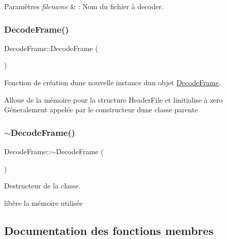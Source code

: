 \begin{DoxyParams}{Paramètres}
{\em filename} & \+: Nom du fichier à decoder. \\
\hline
\end{DoxyParams}
\mbox{\label{class_decode_frame_ae6ae88ee29bcaff936e7c7b2380f96b4}} 
\subsubsection{\texorpdfstring{Decode\+Frame()}{DecodeFrame()}\hspace{0.1cm}{\footnotesize\ttfamily [2/2]}}
{\footnotesize\ttfamily Decode\+Frame\+::\+Decode\+Frame (\begin{DoxyParamCaption}{ }\end{DoxyParamCaption})}



Fonction de création d\textquotesingle{}une nouvelle instance d\textquotesingle{}un objet \hyperlink{class_decode_frame}{Decode\+Frame}. 

Alloue de la mémoire pour la structure Header\+File et l\textquotesingle{}initialise à zero ~\newline
 Géneralement appelée par le constructeur d\textquotesingle{}une classe parente \mbox{\label{class_decode_frame_a150abde40a177b9b585c75d562516f2a}} 
\subsubsection{\texorpdfstring{$\sim$\+Decode\+Frame()}{~DecodeFrame()}}
{\footnotesize\ttfamily Decode\+Frame\+::$\sim$\+Decode\+Frame (\begin{DoxyParamCaption}{ }\end{DoxyParamCaption})}



Destructeur de la classe. 

libère la mémoire utilisée 

\subsection{Documentation des fonctions membres}
\mbox{\label{class_decode_frame_a7d3cb26d923ec22430687186a002c1a8}} 
